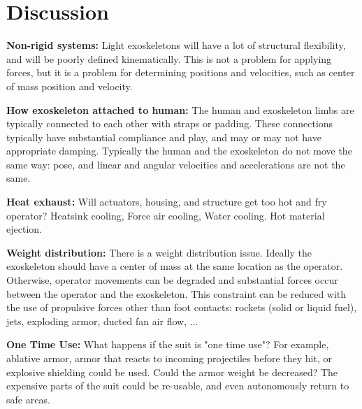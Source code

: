 \documentclass[letterpaper,12pt,fullpage]{article}
\begin{document}
\section{Discussion}

{\bf Non-rigid systems:}
Light exoskeletons will have a lot of structural flexibility,
and will be poorly defined kinematically. This is not a
problem for applying forces, but it is a problem for determining
positions and velocities, such as center of mass position and velocity.

{\bf How exoskeleton attached to human:}
The human and exoskeleton limbs are typically connected to each
other with straps or padding. These connections typically have substantial
compliance and play, and may or may not have appropriate damping.
Typically the human and the exoskeleton do not move the same way:
pose, and linear and angular velocities and accelerations are not the same.

{\bf Heat exhaust:}
Will actuators, housing, and structure get too hot and fry operator?
Heatsink cooling, Force air cooling, Water cooling.
Hot material ejection.

{\bf Weight distribution:}
There is a weight distribution issue. Ideally the exoskeleton should
have a center of mass at the same location as the operator. Otherwise,
operator movements can be degraded and substantial forces occur between
the operator and the exoskeleton.
This constraint can be reduced with the use of propulsive forces other
than foot contacts: rockets (solid or liquid fuel), jets, exploding armor,
ducted fan air flow, ...

{\bf One Time Use:}
What happens if the suit is "one time use"? For example, ablative armor,
armor that reacts to incoming projectiles before they hit,
or explosive shielding could be used. Could the armor weight be decreased?
The expensive parts of the suit could be re-usable, and even autonomously
return to safe areas.
\end{document}
